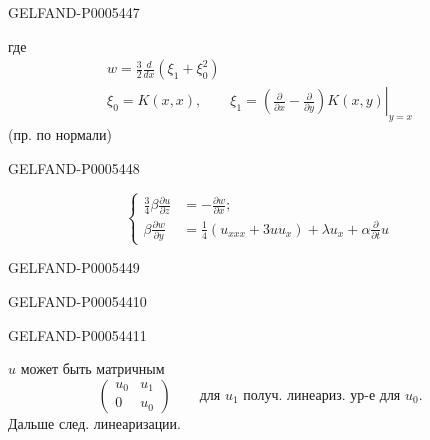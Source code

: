 \begin{GelfandAdjacentEvidence}{GELFAND-P000544}{7}

где
\begin{gather*}
w=\frac32\frac d{dx}(\xi_1+\xi_0^2)\\
\xi_0=K(x,x),\qquad
\xi_1=\left.\left(\frac{\partial}{\partial x}-\frac{\partial}{\partial y}\right)
K(x,y)\right|_{y=x}
\end{gather*}
\hfill (пр. по нормали)\par
{}
\end{GelfandAdjacentEvidence}
\begin{GelfandAdjacentEvidence}{GELFAND-P000544}{8}


\[
\left\{\begin{aligned}
\frac34\beta\frac{\partial u}{\partial z}&=-\frac{\partial w}{\partial x};\\
\beta\frac{\partial w}{\partial y}
&=\frac14\left(u_{xxx}+3uu_x\right)
+\lambda u_x+\alpha\frac{\partial}{\partial t}u
\end{aligned}\right.
\]
\end{GelfandAdjacentEvidence}
\begin{GelfandAdjacentEvidence}{GELFAND-P000544}{9}

\end{GelfandAdjacentEvidence}
\begin{GelfandAdjacentEvidence}{GELFAND-P000544}{10}

\end{GelfandAdjacentEvidence}
\begin{GelfandAdjacentEvidence}{GELFAND-P000544}{11}


\(u\) может быть матричным
\[
\begin{pmatrix}u_0&u_1\\0&u_0\end{pmatrix}
\qquad\text{для }u_1\text{ получ. линеариз. ур-е для }u_0.
\]
Дальше след. линеаризации.
\end{GelfandAdjacentEvidence}
